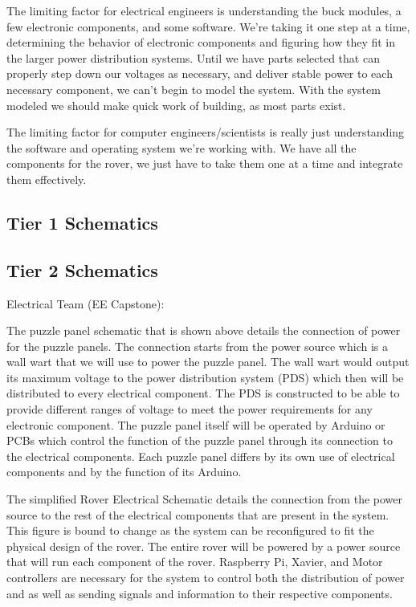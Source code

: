 \documentclass[a4paper, 10pt]{article}
\begin{document}
The limiting factor for electrical engineers is understanding the buck modules, a few electronic components, and some software. We're taking it one step at a time, determining the behavior of electronic components and figuring how they fit in the larger power distribution systems. Until we have parts selected that can properly step down our voltages as necessary, and deliver stable power to each necessary component, we can't begin to model the system. With the system modeled we should make quick work of building, as most parts exist.

The limiting factor for computer engineers/scientists is really just understanding the software and operating system we're working with. We have all the components for the rover, we just have to take them one at a time and integrate them effectively.

	\subsection{Tier 1 Schematics}
	
	\subsection{Tier 2 Schematics}
	Electrical Team (EE Capstone):
	
The puzzle panel schematic that is shown above details the connection of power for the puzzle panels. The connection starts from the power source which is a wall wart that we will use to power the puzzle panel. The wall wart would output its maximum voltage to the power distribution system (PDS) which then will be distributed to every electrical component. The PDS is constructed to be able to provide different ranges of voltage to meet the power requirements for any electronic component. The puzzle panel itself will be operated by Arduino or PCBs which control the function of the puzzle panel through its connection to the electrical components. Each puzzle panel differs by its own use of electrical components and by the function of its Arduino. 
	
	The simplified Rover Electrical Schematic details the connection from the power source to the rest of the electrical components that are present in the system. This figure is bound to change as the system can be reconfigured to fit the physical design of the rover. The entire rover will be powered by a power source that will run each component of the rover. Raspberry Pi, Xavier, and Motor controllers are necessary for the system to control both the distribution of power and as well as sending signals and information to their respective components.  
\end{document}
